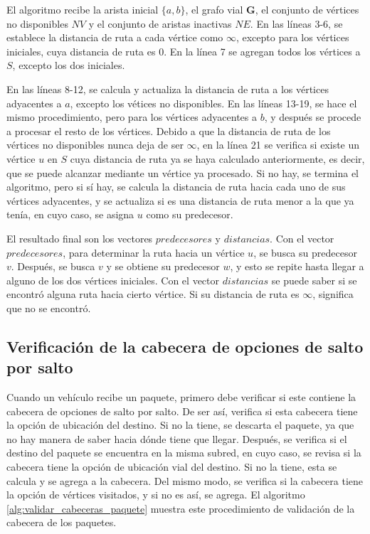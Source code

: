 El algoritmo recibe la arista inicial $\{a,b\}$, el grafo vial $\mathbf{G}$,
el conjunto de vértices no disponibles $NV$ y el conjunto de aristas inactivas
$NE$. En las líneas 3-6, se establece la distancia de ruta a cada vértice como
$\infty$, excepto para los vértices iniciales, cuya distancia de ruta es 0. En
la línea 7 se agregan todos los vértices a $S$, excepto los dos iniciales.

En las líneas 8-12, se calcula y actualiza la distancia de ruta a los vértices
adyacentes a $a$, excepto los vétices no disponibles. En las líneas 13-19, se
hace el mismo procedimiento, pero para los vértices adyacentes a $b$, y después
se procede a procesar el resto de los vértices. Debido a que la distancia de
ruta de los vértices no disponibles nunca deja de ser $\infty$, en la línea 21
se verifica si existe un vértice $u$ en $S$ cuya distancia de ruta ya se haya
calculado anteriormente, es decir, que se puede alcanzar mediante un vértice ya
procesado. Si no hay, se termina el algoritmo, pero si sí hay, se calcula la
distancia de ruta hacia cada uno de sus vértices adyacentes, y se actualiza si
es una distancia de ruta menor a la que ya tenía, en cuyo caso, se asigna $u$
como su predecesor.

El resultado final son los vectores $predecesores$ y $distancias$. Con el
vector $predecesores$, para determinar la ruta hacia un vértice $u$, se busca
su predecesor $v$. Después, se busca $v$ y se obtiene su predecesor $w$, y esto
se repite hasta llegar a alguno de los dos vértices iniciales. Con el vector
$distancias$ se puede saber si se encontró alguna ruta hacia cierto vértice. Si
su distancia de ruta es $\infty$, significa que no se encontró.

\subsection{Verificación de la cabecera de opciones de salto por salto}

\label{subsec:verificacion_cabecera_opciones_salto_por_salto}

Cuando un vehículo recibe un paquete, primero debe verificar si este contiene
la cabecera de opciones de salto por salto. De ser así, verifica si esta
cabecera tiene la opción de ubicación del destino. Si no la tiene, se descarta
el paquete, ya que no hay manera de saber hacia dónde tiene que llegar.
Después, se verifica si el destino del paquete se encuentra en la misma subred,
en cuyo caso, se revisa si la cabecera tiene la opción de ubicación vial del
destino. Si no la tiene, esta se calcula y se agrega a la cabecera. Del mismo
modo, se verifica si la cabecera tiene la opción de vértices visitados, y si no
es así, se agrega. El algoritmo \ref{alg:validar_cabeceras_paquete} muestra
este procedimiento de validación de la cabecera de los paquetes.


